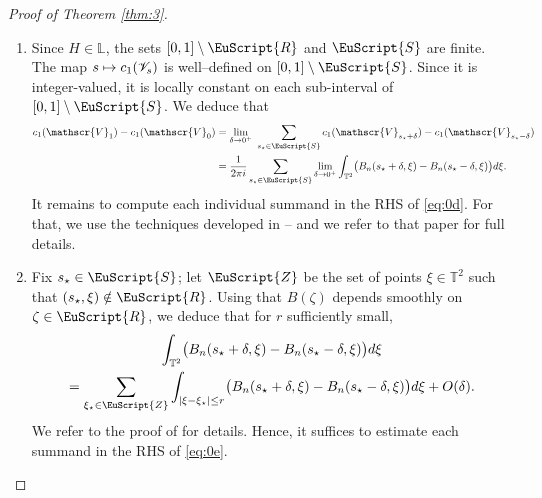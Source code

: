 \documentclass[JEP,XML,SOM,Unicode,NoFloatCountersInSection]{cedram}
\let\pazocal\EuScript
\def\mto{\mathchoice{\longmapsto}{\mapsto}{\mapsto}{\mapsto}}
\theoremstyle{definition}
\DeclareMathOperator{\Id}{Id}
\DeclareMathOperator{\Tr}{Tr}
\newcommand{\EE}{\pazocal{E}}
\newcommand{\RRR}{\pazocal{R}}
\newcommand{\SSS}{{\pazocal{S}}}
\newcommand{\ZZZ}{{\pazocal{Z}}}
\newcommand{\VVV}{{\mathscr{V}}}
\newcommand{\Ll}{\mathbb{L}}
\newcommand{\Tt}{{\mathbb{T}}}
\newcommand{\tsigma}{{\tilde{\sigma}}}
\newcommand{\lr}[1]{\langle #1 \rangle}
\begin{document}
\begin{proof}[Proof of Theorem \ref{thm:3}]
\begin{enumerate}
In Step 6, we will use the space of $2 \times 2$ traceless Hermitian matrices $\EE_0$. This space is equipped with the Hermitian inner product $\lr{T_1,T_2} = \Tr(T_1T_2)$; the Pauli matrices $\sigma_1, \sigma_2, \sigma_3$ form an orthonormal basis. If $\tsigma_1, \tsigma_2, \tsigma_3$ is another orthonormal basis, then there exists $U \in SU(2)$ (unique up to multiplication by $\pm \Id_2$) and $\epsilon \in \{\pm 1\}$ such that
\begin{equation}\label{eq:0h}
\tsigma_k = \epsilon \cdot U \sigma_k U^*, \quad 1 \leq k \leq 3.
\end{equation}
This is precisely the content of the isomorphism between $SU(2) / \{\pm \Id_2\}$ and $SO(3)$; see \eg \cite[\S4.2]{S05}. The number $\epsilon \in \{\pm 1\}$ reads as the determinant of the (orthogonal) matrix of the basis $(\tsigma_1, \tsigma_2, \tsigma_3)$ in the basis $(\sigma_1, \sigma_2, \sigma_3)$.

\item
Since $H \in \Ll$, the sets $[0,1] \setminus \RRR$ and $\SSS$ are finite. The map $s \mto c_1(\VVV_s)$ is well--defined on $[0,1] \setminus \SSS$. Since it is integer-valued, it is locally constant on each sub-interval of $[0,1] \setminus \SSS$. We deduce that
\begin{equation}\label{eq:0d}
\begin{split}
c_1(\VVV_1) - c_1(\VVV_0) &= \lim_{\delta \to 0^+} \ \sum_{s_\star \in \SSS} c_1(\VVV_{s_\star+\delta}) - c_1(\VVV_{s_\star-\delta})
\\
&= \dfrac{1}{2\pi i} \sum_{s_\star \in \SSS} \lim_{\delta \to 0^+} \int_{\Tt^2} \bigl(B_n(s_\star+\delta,\xi) - B_n(s_\star-\delta,\xi) \bigr) d\xi.
\end{split}
\end{equation}
It remains to compute each individual summand in the RHS of \eqref{eq:0d}. For that, we use the techniques developed in \cite[\S2]{D19b} -- and we refer to that paper for full details.

\item
Fix $s_\star \in \SSS$; let $\ZZZ$ be the set of points $\xi \in \Tt^2$ such that $(s_\star,\xi) \notin \RRR$. Using that $B(\zeta)$ depends smoothly on $\zeta \in \RRR$, we deduce that for $r$ sufficiently small,
\begin{multline}\label{eq:0e}
\int_{\Tt^2} \bigl(B_n(s_\star+\delta,\xi) - B_n(s_\star-\delta,\xi) \bigr) d\xi\\
= \sum_{\xi_\star \in \ZZZ} \int_{|\xi-\xi_\star| \leq r} \bigl(B_n(s_\star+\delta,\xi) - B_n(s_\star-\delta,\xi) \bigr) d\xi + O(\delta).
\end{multline}
We refer to the proof of \cite[Lem.\,2.1]{D19b} for details. Hence, it suffices to estimate each summand in the RHS of \eqref{eq:0e}.


\end{enumerate}
\end{proof}
\end{document}
